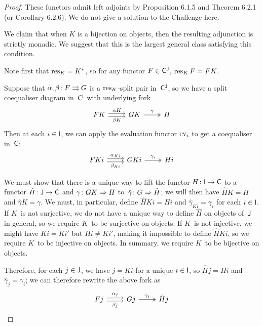 \documentclass[../../solutions]{subfiles}
\begin{document}
\begin{proof}
  These functors admit left adjoints by Proposition 6.1.5 and Theorem
  6.2.1 (or Corollary 6.2.6).  We do not give a solution to the
  Challenge here.
  
  We claim that when $K$ is a bijection on objects, then the resulting
  adjunction is strictly monadic.  We suggest that this is the largest
  general class satisfying this condition.

  Note first that $\operatorname{res}_K=K^*$, so for any functor $F\in{\mathsf{C}}^{\mathsf{J}}$,
  $\operatorname{res}_K F=FK$.

  Suppose that ${\alpha,\beta}\colon{F}\rightrightarrows{G}$ is a $\operatorname{res}_K$-split pair
  in~${\mathsf{C}}^{\mathsf{J}}$, so we have a split coequaliser diagram in~${\mathsf{C}}^{\mathsf{I}}$
  with underlying fork
  $$
  \begin{tikzcd}
    FK
    \ar[r, shift left=0.5ex, "\alpha K"]
    \ar[r, shift right=0.5ex, "\beta K"']
    & GK
    \ar[r, twoheadrightarrow, "\gamma"]
    & H
  \end{tikzcd}
  $$
  Then at each $i\in{\mathsf{I}}$, we can apply the evaluation functor $\operatorname{ev}_i$
  to get a coequaliser in~${\mathsf{C}}$:
  $$
  \begin{tikzcd}
    FKi
    \ar[r, shift left=0.5ex, "\alpha_{Ki}"]
    \ar[r, shift right=0.5ex, "\beta_{Ki}"']
    & GKi
    \ar[r, twoheadrightarrow, "\gamma_i"]
    & Hi
  \end{tikzcd}
  $$
  
  We must show that there is a unique way to lift the functor
  ${H}\colon{{\mathsf{I}}}\to{{\mathsf{C}}}$ to a functor ${\hat H}\colon{{\mathsf{J}}}\to{{\mathsf{C}}}$ and
  ${\gamma}\colon{GK}\Rightarrow{H}$ to~${\hat\gamma}\colon{G}\Rightarrow{\hat H}$; we will
  then have $\hat HK=H$ and $\hat\gamma K=\gamma$.  We must, in
  particular, define $\hat HKi=Hi$ and $\hat\gamma_{Ki}=\gamma_i$ for
  each $i\in{\mathsf{I}}$.  If $K$~is not surjective, we do not have a unique
  way to define $\hat H$ on objects of~${\mathsf{J}}$ in general, so we require
  $K$~to be surjective on objects.  If $K$~is not injective, we might
  have $Ki=Ki'$ but $Hi\ne Ki'$, making it impossible to define
  $\hat HKi$, so we require $K$~to be injective on objects.  In
  summary, we require $K$~to be bijective on objects.

  Therefore, for each $j\in{\mathsf{J}}$, we have $j=Ki$ for a unique
  $i\in{\mathsf{I}}$, so $\hat Hj=Hi$ and $\hat\gamma_j=\gamma_i$; we can
  therefore rewrite the above fork as
  $$
  \begin{tikzcd}
    Fj
    \ar[r, shift left=0.5ex, "\alpha_j"]
    \ar[r, shift right=0.5ex, "\beta_j"']
    & Gj
    \ar[r, twoheadrightarrow, "\hat\gamma_i"]
    & \hat Hj
  \end{tikzcd}
  $$


\end{proof}
\end{document}
